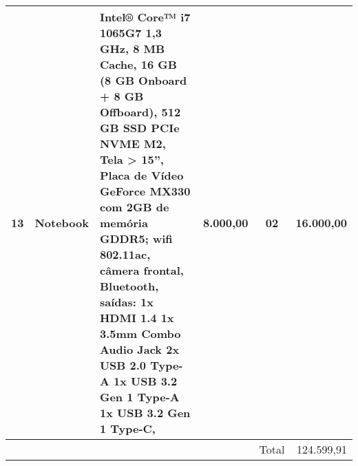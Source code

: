 \begin{table}[!h]
\begin{tabular}{clp{}rcr}
	13  & Notebook              & Intel® Core™ i7 1065G7 1,3 GHz, 8 MB Cache, 16 GB (8 GB Onboard + 8 GB Offboard), 512 GB SSD PCIe NVME M2, Tela > 15'', Placa de Vídeo GeForce MX330 com 2GB de memória GDDR5; wifi 802.11ac, câmera frontal, Bluetooth, saídas: 1x HDMI 1.4 1x 3.5mm Combo Audio Jack 2x USB 2.0 Type-A 1x USB 3.2 Gen 1 Type-A 1x USB 3.2 Gen 1 Type-C,                                                                                      & 8.000,00    & 02         &  16.000,00 \\
\midrule
             &                      &                                                                                      &             & Total      & 124.599,91 \\
\bottomrule
\end{tabular}
	\label{tab:capital}
\end{table}
\newpage

